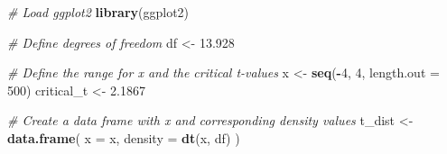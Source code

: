 \documentclass[
]{book}
\newenvironment{Shaded}{\begin{snugshade}}{\end{snugshade}}
\newcommand{\AttributeTok}[1]{\textcolor[rgb]{0.13,0.29,0.53}{#1}}
\newcommand{\CommentTok}[1]{\textcolor[rgb]{0.56,0.35,0.01}{\textit{#1}}}
\newcommand{\DecValTok}[1]{\textcolor[rgb]{0.00,0.00,0.81}{#1}}
\newcommand{\FloatTok}[1]{\textcolor[rgb]{0.00,0.00,0.81}{#1}}
\newcommand{\FunctionTok}[1]{\textcolor[rgb]{0.13,0.29,0.53}{\textbf{#1}}}
\newcommand{\NormalTok}[1]{#1}
\newcommand{\OtherTok}[1]{\textcolor[rgb]{0.56,0.35,0.01}{#1}}
\newcommand{\SpecialCharTok}[1]{\textcolor[rgb]{0.81,0.36,0.00}{\textbf{#1}}}
\begin{document}
\begin{Shaded}
\begin{Highlighting}[]
\CommentTok{\# Load ggplot2}
\FunctionTok{library}\NormalTok{(ggplot2)}

\CommentTok{\# Define degrees of freedom}
\NormalTok{df }\OtherTok{\textless{}{-}} \FloatTok{13.928}

\CommentTok{\# Define the range for x and the critical t{-}values}
\NormalTok{x }\OtherTok{\textless{}{-}} \FunctionTok{seq}\NormalTok{(}\SpecialCharTok{{-}}\DecValTok{4}\NormalTok{, }\DecValTok{4}\NormalTok{, }\AttributeTok{length.out =} \DecValTok{500}\NormalTok{)}
\NormalTok{critical\_t }\OtherTok{\textless{}{-}} \FloatTok{2.1867}

\CommentTok{\# Create a data frame with x and corresponding density values}
\NormalTok{t\_dist }\OtherTok{\textless{}{-}} \FunctionTok{data.frame}\NormalTok{(}
  \AttributeTok{x =}\NormalTok{ x,}
  \AttributeTok{density =} \FunctionTok{dt}\NormalTok{(x, df)}
\NormalTok{)}


\end{Highlighting}
\end{Shaded}
\end{document}
